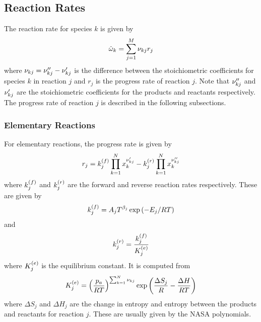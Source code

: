 \subsection{Reaction Rates}
The reaction rate for species $k$ is given by 
\begin{align}
  \dot{\omega}_{k} = \sum_{j=1}^{M}{\nu_{kj}r_{j}}
\end{align}
 where $\nu_{kj} = \nu_{kj}^{\prime\prime} - \nu_{kj}^{\prime}$ is the difference between
 the stoichiometric coefficients for species $k$ 
in reaction $j$ and $r_{j}$ is the progress rate of reaction $j$.  
Note that $\nu_{kj}^{\prime\prime}$ and $\nu_{kj}^{\prime}$ are the stoichiometric 
coefficients for the products and reactants respectively. The 
progress rate of reaction $j$ is described in the following 
subsections.
\subsubsection{Elementary Reactions}
For elementary reactions, the progress rate is given by 
\begin{align}
  r_{j} = k_{j}^{\left(f\right)}\prod_{k=1}^{N}{x_{k}^{\nu_{kj}^{\prime}}} - 
          k_{j}^{\left(r\right)}\prod_{k=1}^{N}{x_{k}^{\nu_{kj}^{\prime\prime}}} \label{eq:rj_elem}
\end{align}
where $k_{j}^{\left(f\right)}$ and $k_{j}^{\left(r\right)}$ are the forward and reverse reaction rates 
respectively.  These are given by 
\begin{align}
  k_{j}^{\left(f\right)} = A_{j}T^{\beta_{j}}\exp\left(-E_{j}/RT\right)
\end{align}
and 
\begin{align}
  k_{j}^{\left(r\right)} = \frac{k_{j}^{\left(f\right)}}{K_{j}^{\left(e\right)}}
\end{align}
where $K_{j}^{\left(e\right)}$ is the equilibrium constant.  It is computed from 
\begin{align}
  K_{j}^{\left(e\right)} = \left(\frac{p_{a}}{RT}\right)^{\sum_{k=1}^{N}{\nu_{kj}}}\exp\left(\frac{\Delta S_{j}}{R} - \frac{\Delta H}{RT}\right)
\end{align}
where $\Delta S_{j}$ and $\Delta H_{j}$ are the change in entropy and entropy 
between the products and reactants for reaction $j$.  These are usually given 
by the NASA polynomials.

